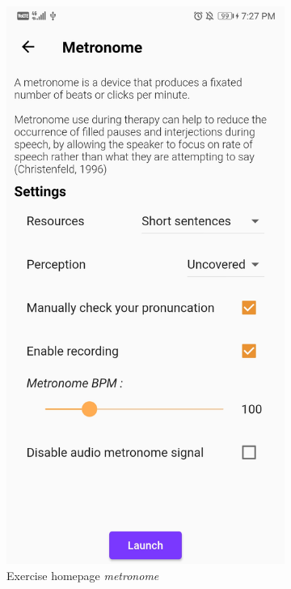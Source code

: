 \begin{appendices}
\begin{landscape}
\begin{figure}[h]
\begin{subfigure}{.25\textwidth}
    \includegraphics[width=.75\linewidth]{content/imgs/screen3.jpg}
    \caption{Exercise homepage \textit{metronome}}
  \end{subfigure}%
  \begin{subfigure}{.25\textwidth}
    \centering

\end{subfigure}
\end{figure}
\end{landscape}
\end{appendices}
